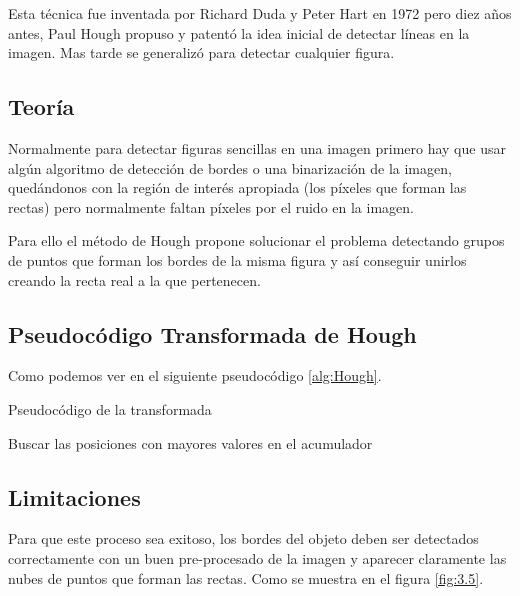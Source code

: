 Esta técnica fue inventada por Richard Duda y Peter Hart en 1972 pero diez años antes, Paul Hough propuso y patentó \cite{pat:patHough} la idea inicial de detectar líneas en la imagen. Mas tarde se generalizó para detectar cualquier figura.

\subsection{Teoría}

Normalmente para detectar figuras sencillas en una imagen primero hay que usar algún algoritmo de detección de bordes o una binarización de la imagen, quedándonos con la región de interés apropiada (los píxeles que forman las rectas) pero normalmente faltan píxeles por el ruido en la imagen.

Para ello el método de Hough propone solucionar el problema detectando grupos de puntos que forman los bordes de la misma figura y así conseguir unirlos creando la recta real a la que pertenecen.

\subsection{Pseudocódigo Transformada de Hough}
Como podemos ver en el siguiente pseudocódigo 
\ref{alg:Hough}.

\begin{algorithm*}
\caption{Pseudocódigo de la transformada}
\DontPrintSemicolon
{}


Buscar las posiciones con mayores valores en el acumulador\;	

\label{alg:Hough}
\end{algorithm*}

\subsection{Limitaciones}
Para que este proceso sea exitoso, los bordes del objeto deben ser detectados correctamente con un buen pre-procesado de la imagen y aparecer claramente las nubes de puntos que forman las rectas.
Como se muestra en el figura \ref{fig:3.5}.

